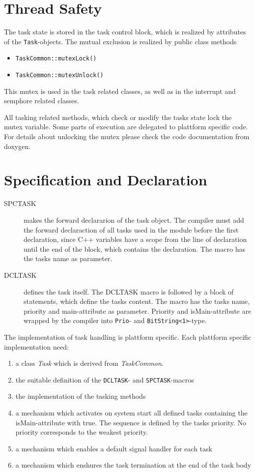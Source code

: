 \section{Thread Safety}
The task state is stored in the task control block, which is realized
by attributes of the \verb|Task|-objects.
The mutual exclusion is realized by  public class methods
\begin{itemize}
\item \verb|TaskCommon::mutexLock()|
\item \verb|TaskCommon::mutexUnlock()|
\end{itemize}
 
This mutex is used in the task related classes, as well as in the interrupt
and semphore related classes. 

All tasking related methods, which check or modify  the tasks state lock the 
mutex variable. Some parts of execution are delegated to plattform specific
code. For details about unlocking the mutex please check the code
documentation from doxygen.


\section{Specification and Declaration}
\begin{description}
\item[SPCTASK] makes the forward declararion of the task object.
    The compiler must add the forward declaraction of all tasks
    used in the module before the first declaration, since C++
    variables have a scope from the line of declaration until 
    the end of the block, which contains the declaration.
    The macro has the tasks name as parameter.
\item[DCLTASK] defines the task itself. The DCLTASK macro is followed
    by a block of statements, which define the tasks content.
    The macro has the tasks name, priority and main-attribute as
    parameter. 
    Priority and isMain-attribute are wrapped by the compiler 
    into \verb|Prio|- and \verb|BitString<1>|-type.
\end{description}

The implementation of task handling is plattform specific.
Each plattform specific implementation need:
\begin{enumerate}
\item  a class {\em Task} which is derived from {\em TaskCommon}.
\item the suitable definition of the \verb|DCLTASK|- and \verb|SPCTASK|-macros
\item the implementation of the tasking methods
\item a mechanism which activates on system start
   all defined tasks containing the isMain-attribute with true. 
   The sequence is defined by the tasks priority. 
   No priority corresponds to the weakest priority.
\item a mechanism which enables a default signal handler for each task
\item a mechanism which enshures the task termination at the end of
   the task body
\end{enumerate}

